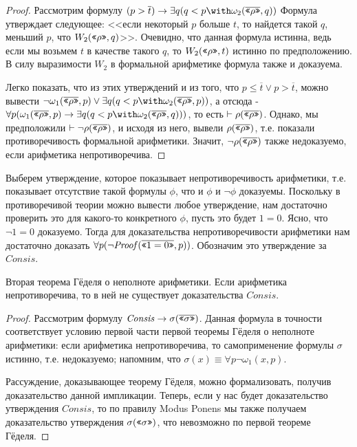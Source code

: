 \begin{proof}
Рассмотрим формулу $(p > \overline{t}) \rightarrow \exists q (q < p \with \omega_2 (\ogq{\rho},q))$
Формула утверждает следующее: <<если некоторый $p$ больше $t$, то найдется
такой $q$, меньший $p$, что $W_2 (\texttt{<<}\rho\texttt{>>},q)$>>. Очевидно, что данная формула истинна,
ведь если мы возьмем $t$ в качестве такого $q$, то $W_2 (\texttt{<<}\rho\texttt{>>},t)$ истинно 
по предположению. В силу выразимости $W_2$ в формальной арифметике формула также и доказуема.

Легко показать, что из этих утверждений и из того, что $p \le \overline{t} \vee p > \overline{t}$,
можно вывести $\neg \omega_1 (\ogq{\rho},p) \vee \exists q (q < p \with \omega_2 (\ogq{\rho},p))$,
а отсюда - $\forall p (\omega_1 (\ogq{\rho},p) \rightarrow \exists q (q < p \with \omega_2 (\ogq{\rho},q)))$,
то есть $\vdash\rho(\overline{\texttt{<<}\rho\texttt{>>}})$. Однако, мы предположили $\vdash\neg\rho(\overline{\texttt{<<}\rho\texttt{>>}})$, и исходя из него,
вывели $\rho(\overline{\texttt{<<}\rho\texttt{>>}})$, т.е. показали противоречивость формальной арифметики. Значит, 
$\neg \rho(\overline{\texttt{<<}\rho\texttt{>>}})$ также недоказуемо, если арифметика непротиворечива.
\end{proof}

Выберем утверждение, которое показывает непротиворечивость арифметики, т.е. 
показывает отсутствие такой формулы $\phi$, что и $\phi$ и $\neg \phi$ доказуемы.
Поскольку в противоречивой теории можно вывести любое утверждение, нам
достаточно проверить это для какого-то конкретного $\phi$, пусть это будет
$1=0$. Ясно, что $\neg 1=0$ доказуемо.
 Тогда для доказательства непротиворечивости арифметики нам достаточно
доказать $\forall p (\neg \mathit{Proof} (\overline{\texttt{<<}1=0\texttt{>>}}, p))$. Обозначим это утверждение
за $\mathit{Consis}$.

\begin{theorem}{Вторая теорема Гёделя о неполноте арифметики.}
Если арифметика непротиворечива, то в ней не существует доказательства $\mathit{Consis}$.
\end{theorem}

\begin{proof}
Рассмотрим формулу $\mathit{Consis} \rightarrow \sigma(\overline{\texttt{<<}\sigma\texttt{>>}})$.
Данная формула в точности соответствует условию первой части первой теоремы Гёделя 
о неполноте арифметики: 
если арифметика непротиворечива, то самоприменение формулы $\sigma$ истинно, т.е.
недоказуемо; напомним, что $\sigma(x) \equiv \forall p \neg \omega_1 (x,p)$.

Рассуждение, доказывающее теорему Гёделя, можно формализовать, получив доказательство
данной импликации. Теперь, если у нас будет доказательство утверждения $\mathit{Consis}$,
то по правилу Modus Ponens мы также получаем доказательство утверждения 
$\sigma (\texttt{<<}\sigma\texttt{>>})$, что невозможно по первой теореме Гёделя.
\end{proof}

